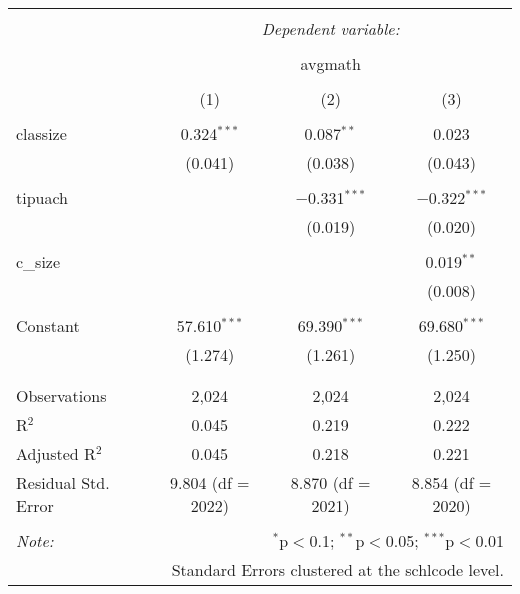 
\begin{table}[!htbp] \centering 
  \caption{} 
  \label{} 
\begin{tabular}{@{\extracolsep{5pt}}lccc} 
\\[-1.8ex]\hline 
\hline \\[-1.8ex] 
 & \multicolumn{3}{c}{\textit{Dependent variable:}} \\ 
\cline{2-4} 
\\[-1.8ex] & \multicolumn{3}{c}{avgmath} \\ 
\\[-1.8ex] & (1) & (2) & (3)\\ 
\hline \\[-1.8ex] 
 classize & 0.324$^{***}$ & 0.087$^{**}$ & 0.023 \\ 
  & (0.041) & (0.038) & (0.043) \\ 
  & & & \\ 
 tipuach &  & $-$0.331$^{***}$ & $-$0.322$^{***}$ \\ 
  &  & (0.019) & (0.020) \\ 
  & & & \\ 
 c\_size &  &  & 0.019$^{**}$ \\ 
  &  &  & (0.008) \\ 
  & & & \\ 
 Constant & 57.610$^{***}$ & 69.390$^{***}$ & 69.680$^{***}$ \\ 
  & (1.274) & (1.261) & (1.250) \\ 
  & & & \\ 
\hline \\[-1.8ex] 
Observations & 2,024 & 2,024 & 2,024 \\ 
R$^{2}$ & 0.045 & 0.219 & 0.222 \\ 
Adjusted R$^{2}$ & 0.045 & 0.218 & 0.221 \\ 
Residual Std. Error & 9.804 (df = 2022) & 8.870 (df = 2021) & 8.854 (df = 2020) \\ 
\hline 
\hline \\[-1.8ex] 
\textit{Note:}  & \multicolumn{3}{r}{$^{*}$p$<$0.1; $^{**}$p$<$0.05; $^{***}$p$<$0.01} \\ 
 & \multicolumn{3}{r}{Standard Errors clustered at the schlcode level.} \\ 
\end{tabular} 
\end{table} 
